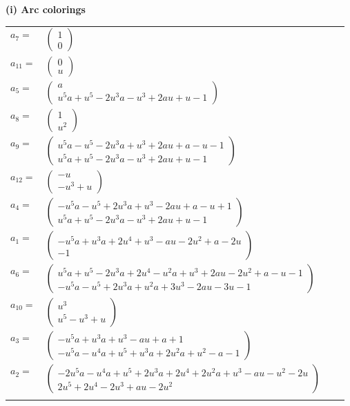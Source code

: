 \documentclass[1p]{elsarticle_modified}
\theoremstyle{definition}
\begin{document}
\flushleft \textbf{(i) Arc colorings}\\
\begin{tabular}{m{7pt} m{180pt} m{7pt} m{180pt} }
\flushright $a_{7}=$&$\begin{pmatrix}1\\0\end{pmatrix}$ \\
\flushright $a_{11}=$&$\begin{pmatrix}0\\u\end{pmatrix}$ \\
\flushright $a_{5}=$&$\begin{pmatrix}a\\u^5 a+u^5-2 u^3 a- u^3+2 a u+u-1\end{pmatrix}$ \\
\flushright $a_{8}=$&$\begin{pmatrix}1\\u^2\end{pmatrix}$ \\
\flushright $a_{9}=$&$\begin{pmatrix}u^5 a- u^5-2 u^3 a+u^3+2 a u+a- u-1\\u^5 a+u^5-2 u^3 a- u^3+2 a u+u-1\end{pmatrix}$ \\
\flushright $a_{12}=$&$\begin{pmatrix}- u\\- u^3+u\end{pmatrix}$ \\
\flushright $a_{4}=$&$\begin{pmatrix}- u^5 a- u^5+2 u^3 a+u^3-2 a u+a- u+1\\u^5 a+u^5-2 u^3 a- u^3+2 a u+u-1\end{pmatrix}$ \\
\flushright $a_{1}=$&$\begin{pmatrix}- u^5 a+u^3 a+2 u^4+u^3- a u-2 u^2+a-2 u\\-1\end{pmatrix}$ \\
\flushright $a_{6}=$&$\begin{pmatrix}u^5 a+u^5-2 u^3 a+2 u^4- u^2 a+u^3+2 a u-2 u^2+a- u-1\\- u^5 a- u^5+2 u^3 a+u^2 a+3 u^3-2 a u-3 u-1\end{pmatrix}$ \\
\flushright $a_{10}=$&$\begin{pmatrix}u^3\\u^5- u^3+u\end{pmatrix}$ \\
\flushright $a_{3}=$&$\begin{pmatrix}- u^5 a+u^3 a+u^3- a u+a+1\\- u^5 a- u^4 a+u^5+u^3 a+2 u^2 a+u^2- a-1\end{pmatrix}$ \\
\flushright $a_{2}=$&$\begin{pmatrix}-2 u^5 a- u^4 a+u^5+2 u^3 a+2 u^4+2 u^2 a+u^3- a u- u^2-2 u\\2 u^5+2 u^4-2 u^3+a u-2 u^2\end{pmatrix}$\\&\end{tabular}
\end{document}
